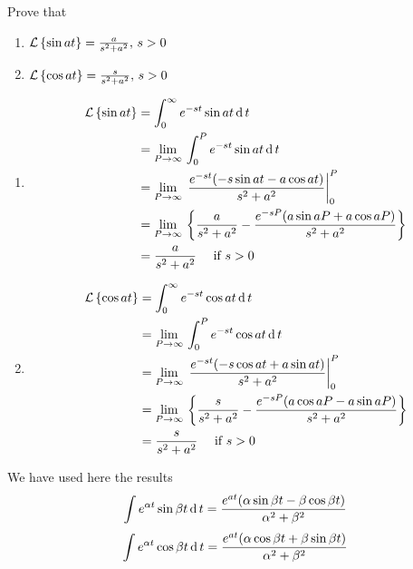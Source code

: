 \documentclass[../main-sheet.tex]{subfiles}
\begin{document}
\begin{prob}
    Prove that
    \begin{enumerate}[label={(\alph*)}]
        \item $ \mathcal{L}\left\{ \sin at\right\}=\frac{a}{s^2+a^2},\,s>0 $
        \item $ \mathcal{L}\left\{ \cos at\right\}=\frac{s}{s^2+a^2},\,s>0 $
    \end{enumerate}
\end{prob}
\newpage
\begin{soln}
    \hfill
    \begin{enumerate}[label={(\alph*)}]
        \item \begin{align*}
            \mathcal{L}\left\{ \sin at\right\}&=\int_0^\infty e^{-st}\sin at \,\mathrm{d}\, t\\
            &=\lim\limits_{P\to \infty}\,\int_0^P e^{-st}\sin at \,\mathrm{d}\, t\\
            &=\lim\limits_{P\to \infty}\,\left.\frac{e^{-st}(-s\sin at -a \cos at)}{s^2+a^2}\right\vert_0^P\\
            &=\lim\limits_{P\to \infty}\,\left\{ \frac{a}{s^2+a^2}-\frac{e^{-sP}(a\sin aP+a\cos aP)}{s^2+a^2}\right\}\\
            &=\frac{a}{s^2+a^2}\quad \text{ if } s>0
        \end{align*}
        \item \begin{align*}
            \mathcal{L}\left\{ \cos at\right\}&=\int_0^\infty e^{-st}\cos at \,\mathrm{d}\, t\\
            &=\lim\limits_{P\to \infty}\,\int_0^P e^{-st}\cos at \,\mathrm{d}\, t\\
            &=\lim\limits_{P\to \infty}\,\left.\frac{e^{-st}(-s\cos at +a \sin at)}{s^2+a^2}\right\vert_0^P\\
            &=\lim\limits_{P\to \infty}\,\left\{ \frac{s}{s^2+a^2}-\frac{e^{-sP}(a\cos aP-a\sin aP)}{s^2+a^2}\right\}\\
            &=\frac{s}{s^2+a^2}\quad \text{ if } s>0
        \end{align*}
    \end{enumerate}
    We have used here the results
    \[\int e^{\alpha t}\sin \beta t \,\mathrm{d}\, t=\frac{e^{at}(\alpha \sin \beta t-\beta \cos \beta t)}{\alpha^2+\beta^2}\]
    \[\int e^{\alpha t}\cos \beta t \,\mathrm{d}\, t=\frac{e^{at}(\alpha \cos \beta t+\beta \sin \beta t)}{\alpha^2+\beta^2}\]
\end{soln}
\end{document}

